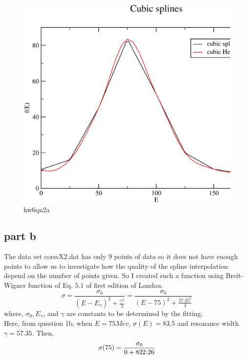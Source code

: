 \documentclass[11pt,a4paper,english]{article}
\newcommand{\bdm}{\begin{displaymath}}
\newcommand{\edm}{\end{displaymath}}
\begin{document}
	\begin{figure}[h!]
	\centering
	\includegraphics [scale=0.6]{hw6qn2a.eps}
	\caption{hw6qn2a }
	\end{figure}
	\clearpage
	
	
	\subsection{part b}
The data set corssX2.dat has only 9 points of data so it does not have enough points to allow us to investigate how the quality of the spline interpolation depend on the number of points given. So I created such a function using Breit-Wigner function of Eq. $5.1$ of first edition of Landau.\\
\bdm
\sigma = \frac{\sigma_{0}}{({E - E_{\gamma}})^{2} + \frac{{\gamma}^{2}}{4}}
= \frac{\sigma_{0}}{({E - 75})^{2} + \frac{{57.35}^{2}}{4}}
\edm
where, $\sigma_{0}, E_{\gamma}$, and $\gamma$ are constants to be determined by the fitting.\\
Here, from question 1b, when $E=75 Mev$, $\sigma(E) = 83.5 $ and resonance width $ \gamma = 57.35$.
Then,\\

\bdm
\sigma(75) = \frac{\sigma_{0}}{0 + 822.26}\\
\edm
\end{document}
